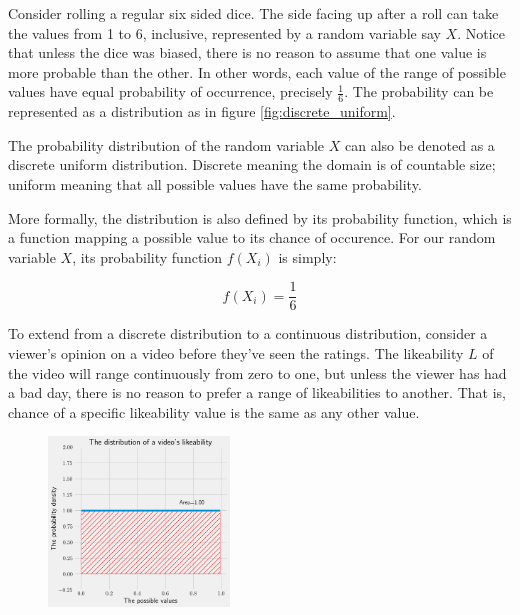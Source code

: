 \documentclass[a4paper,11pt]{article}
\begin{document}
Consider rolling a regular six sided dice. The side facing up after a roll can take the values from 1 to 6, inclusive, represented by a random variable say $X$. Notice that unless the dice was biased, there is no reason to assume that one value is more probable than the other. In other words, each value of the range of possible values have equal probability of occurrence, precisely $\frac{1}{6}$. The probability can be represented as a distribution as in figure \ref{fig:discrete_uniform}.

The probability distribution of the random variable $X$ can also be denoted as a discrete uniform distribution. Discrete meaning the domain is of countable size; uniform meaning that all possible values have the same probability.

More formally, the distribution is also defined by its probability function, which is a function mapping a possible value to its chance of occurence. For our random variable $X$, its probability function $f(X_i)$ is simply:

\[
    f(X_i) = \frac{1}{6}
\]


To extend from a discrete distribution to a continuous distribution, consider a viewer's opinion on a video before they've seen the ratings. The likeability $L$ of the video will range continuously from zero to one, but unless the viewer has had a bad day, there is no reason to prefer a range of likeabilities to another. That is, chance of a specific likeability value is the same as any other value.

\begin{figure}
    \includegraphics[width=0.43\textwidth,right]{assets/uniform_pdfs.png}
    \caption{}
    \label{fig:uniform}
\end{figure}
\end{document}

